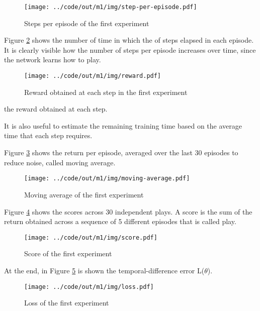 \documentclass[a4paper,12pt]{article} %
\begin{document}
	\begin{figure}[htb]
		\centering
		\texttt{[image: ../code/out/m1/img/step-per-episode.pdf]}	
		\caption{Steps per episode of the first experiment}
		\label{fig:step-m1}
	\end{figure}
	\bigskip
	Figure \ref{fig:reward-m1} shows the number of time in which the  of steps elapsed in each episode.
	It is clearly visible how the number of steps per episode increases over time, since the network learns how to play.
	
	\begin{figure}[htb]
		\centering
		\texttt{[image: ../code/out/m1/img/reward.pdf]}	
		\caption{Reward obtained at each step in the first experiment}
		\label{fig:reward-m1}
	\end{figure}
	\bigskip

	the reward obtained at each step. 
	 
	It is also useful to estimate the remaining training time based on the average time that each step requires.
	
	Figure \ref{fig:movingavg-m1} shows the return per episode, averaged over the last 30 episodes to reduce noise, called moving average.
	
	\begin{figure}[htb]
		\centering
		\texttt{[image: ../code/out/m1/img/moving-average.pdf]}	
		\caption{Moving average of the first experiment}
		\label{fig:movingavg-m1}
	\end{figure}
	\bigskip
	Figure \ref{fig:score-m1} shows the scores across 30 independent plays. A score is the sum of the return obtained across a sequence of 5 different episodes that is called play.
	\begin{figure}[htb]
		\centering
		\texttt{[image: ../code/out/m1/img/score.pdf]}	
		\caption{Score of the first experiment}
		\label{fig:score-m1}
	\end{figure} 
	\bigskip
	
	At the end, in Figure \ref{fig:loss-m1} is shown the temporal-difference error L($\theta$).
	\begin{figure}[htb]
		\centering
		\texttt{[image: ../code/out/m1/img/loss.pdf]}	
		\caption{Loss of the first experiment}
		\label{fig:loss-m1}
	\end{figure} 
\end{document}
